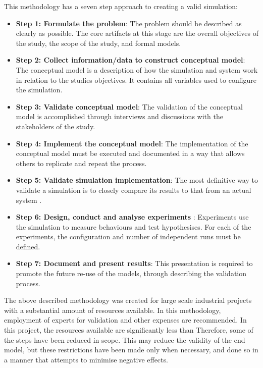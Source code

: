 This methodology has a seven step approach to creating a valid simulation:
\begin{itemize}
  \item \textbf{Step 1: Formulate the problem}: %
	The problem should be described as clearly as possible.
	The core artifacts at this stage are the overall objectives of the study, the scope of the study, and formal models.
\item \textbf{Step 2: Collect information/data to construct conceptual model}: %
	The conceptual model is a description of how the simulation and system work in relation to the studies objectives.
	It contains all variables used to configure the simulation. 
\item \textbf{Step 3: Validate conceptual model}: %
	The validation of the conceptual model is accomplished through interviews and discussions with the stakeholders of the study.
\item \textbf {Step 4: Implement the conceptual model}: %
	The implementation of the conceptual model must be executed and documented in a way that allows others to replicate and repeat the process.
\item \textbf{Step 5: Validate simulation implementation}: %
	The most definitive way to validate a simulation is to closely compare its results to that from an actual system \citep{Law2005}.
\item \textbf{Step 6: Design, conduct and analyse experiments} :
	Experiments use the simulation to measure behaviours and test hypothesises. 
	For each of the experiments, the configuration and number of independent runs must be defined.
\item \textbf{Step 7: Document and present results}:
	This presentation is required to promote the future re-use of the models, through describing the validation process.
\end{itemize}

The above described methodology was created for large scale industrial projects with a substantial amount of resources available.
In this methodology, employment of experts for validation and other expenses are recommended. %
In this project, the resources available are significantly less than 
Therefore, some of the steps have been reduced in scope.
This may reduce the validity of the end model, but these restrictions have been made only when necessary,
and done so in a manner that attempts to minimise negative effects.

